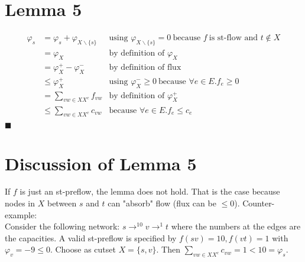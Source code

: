 \documentclass[10pt,a4paper]{article}
\begin{document}
	\section{Lemma 5}
	\begin{align*}
	\varphi_s &= \varphi_s + \varphi_{X\backslash\{s\}} &\text{using }\varphi_{X\backslash\{s\}} = 0~ \text{because }f~\text{is st-flow and }t \notin X\\
	&= \varphi_X & \text{by definition of }\varphi_X\\
	&= \varphi_X^+ - \varphi_X^- & \text{by definition of flux} \\
	&\leq \varphi_X^+ &\text{using }\varphi_X^- \geq 0~\text{because }\forall e\in E. f_e \geq 0 \\
	&= \sum_{vw \in XX^c} f_{vw} &\text{by definition of }\varphi_X^+ \\
	&\leq \sum_{vw \in XX^c} c_{vw} &\text{because }\forall e \in E. f_e \leq c_e \\
	\end{align*} \hfill $\blacksquare$
	
	\section{Discussion of Lemma 5}
	If $f$ is just an st-preflow, the lemma does not hold. 
	That is the case because nodes in $X$ between $s$ and $t$ can "absorb" flow (flux can be $\leq 0$). Counter-example: \\
	Consider the following network: $s \rightarrow^{10} v \rightarrow^{1} t$ where the numbers at the edges are the capacities.
	A valid st-preflow is specified by $f(sv) = 10, f(vt) = 1$ with $\varphi_v = -9 \leq 0$.
	Choose as cutset $X = \{s,v\}$. Then $\sum_{vw \in XX^c} c_{vw} = 1 < 10 = \varphi_s$.
\end{document}
